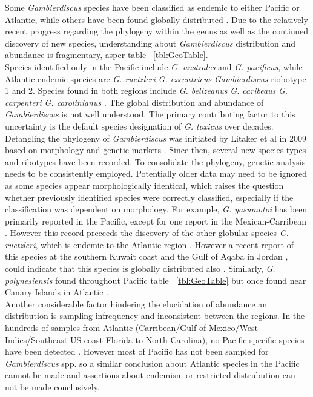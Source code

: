 \documentclass[12pt]{article}
\begin{document}
Some \emph{Gambierdiscus} species have been classified as endemic to either Pacific or Atlantic, while others have been found globally distributed \cite{berdalet2012global,litaker2010global}. Due to the relatively recent progress regarding the phylogeny within the genus as well as the continued discovery of new species, understanding about \emph{Gambierdiscus} distribution and abundance is fragmentary, asper table ~\ref{tbl:GeoTable}. \\
Species identified only in the Pacific include \emph{G. australes} and \emph{G. pacificus}, while Atlantic endemic species are \emph{G. ruetzleri} \emph{G. excentricus} \emph{Gambierdiscus} riobotype 1 and 2. Species found in both regions include \emph{G. belizeanus} \emph{G. caribeaus} \emph{G. carpenteri} \emph{G. carolinianus} \cite{litaker2010global,litaker2009taxonomy,berdalet2012global}. %
The global distribution and abundance of \emph{Gambierdiscus} is not well understood. The primary contributing factor to this uncertainty is the default species designation of \emph{G. toxicus} over decades. Detangling the phylogeny of \emph{Gambierdiscus} was initiated by Litaker et al in 2009 based on morphology and genetic markers \cite{litaker2009taxonomy}. Since then, several new species types and ribotypes have been recorded. To consolidate the phylogeny, genetic analysis needs to be consistently employed. Potentially older data may need to be ignored as some species appear morphologically identical, which raises the question whether previously identified species were correctly classified, especially if the classification was dependent on morphology.
For example, \emph{G. yasumotoi} has been primarily reported in the Pacific, except for one report in the Mexican-Carribean \cite{hernandez2004species}. However this record preceeds the discovery of the other globular species \emph{G. ruetzleri}, which is endemic to the Atlantic region \cite{litaker2009taxonomy}. However a recent report of this species at the southern Kuwait coast and the Gulf of Aqaba in Jordan \cite{saburova2013new}, could indicate that this species is globally distributed also \cite{xu2014distribution}.
Similarly, \emph{G. polynesiensis} found throughout Pacific table ~\ref{tbl:GeoTable} but once found near Canary Islands in Atlantic \cite{fraga2011gambierdiscus}. \\
Another considerable factor hindering the elucidation of abundance an distribution is sampling infrequency and inconsistent between the regions. In the hundreds of samples from Atlantic (Carribean/Gulf of Mexico/West Indies/Southeast US coast Florida to North Carolina), no Pacific-specific species have been detected \cite{berdalet2012global,litaker2010global}. However most of Pacific has not been sampled for \emph{Gambierdiscus} spp. so a similar conclusion about Atlantic species in the Pacific cannot be made and assertions about endemism or restricted distrubution can not be made conclusively.
\end{document}
